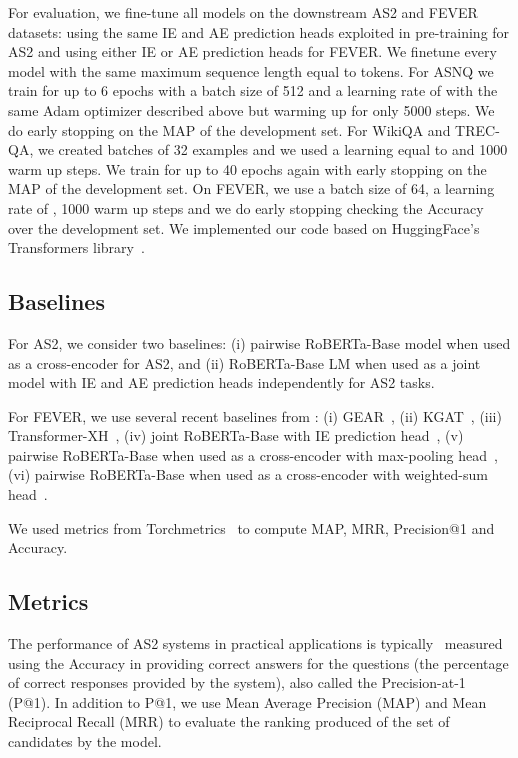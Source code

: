 For evaluation, we fine-tune all models on the downstream AS2 and FEVER datasets: using the same IE and AE prediction heads exploited in pre-training for AS2 and using either IE or AE prediction heads for FEVER. We finetune every model with the same maximum sequence length equal to  tokens. For ASNQ we train for up to 6 epochs with a batch size of 512 and a learning rate of  with the same Adam optimizer described above but warming up for only 5000 steps. We do early stopping on the MAP of the development set. For WikiQA and TREC-QA, we created batches of 32 examples and we used a learning equal to  and 1000 warm up steps. We train for up to 40 epochs again with early stopping on the MAP of the development set. On FEVER, we use a batch size of 64, a learning rate of , 1000 warm up steps and we do early stopping checking the Accuracy over the development set. We implemented our code based on HuggingFace's Transformers library~\cite{wolf-etal-2020-transformers}.

\subsection{Baselines}
For AS2, we consider two baselines: (i) pairwise RoBERTa-Base model when used as a cross-encoder for AS2, and (ii) RoBERTa-Base LM when used as a joint model with IE and AE prediction heads independently for AS2 tasks.

For FEVER, we use several recent baselines from \citeauthor{tymoshenko-moschitti-2021-strong}: (i) GEAR~\cite{zhou-etal-2019-gear}, (ii) KGAT~\cite{liu2020kernel}, (iii) Transformer-XH~\cite{zhao2020transformer-xh}, (iv) joint RoBERTa-Base with IE prediction head~\cite{tymoshenko-moschitti-2021-strong}, (v) pairwise RoBERTa-Base when used as a cross-encoder with max-pooling head~\cite{tymoshenko-moschitti-2021-strong}, (vi) pairwise RoBERTa-Base when used as a cross-encoder with weighted-sum head~\cite{tymoshenko-moschitti-2021-strong}.

We used metrics from Torchmetrics~\cite{torchmetrics} to compute MAP, MRR, Precision@1 and Accuracy.


\subsection{Metrics}

The performance of AS2 systems in practical applications is typically~\cite{garg-moschitti-2021-will} measured using the Accuracy in providing correct answers for the questions (the percentage of correct responses provided by the system), also called the Precision-at-1 (P@1). In addition to P@1, we use Mean Average Precision (MAP) and Mean Reciprocal Recall (MRR) to evaluate the ranking produced of the set of candidates by the model.

